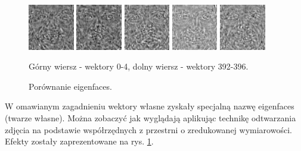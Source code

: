 \documentclass[oneside, eng]{mgr}
\begin{document}
\begin{figure}
	\begin{minipage}{2cm}
		\includegraphics[width=2cm]{392.jpg}
	\end{minipage}
	\begin{minipage}{2cm}
		\includegraphics[width=2cm]{393.jpg}
	\end{minipage}
	\begin{minipage}{2cm}
		\includegraphics[width=2cm]{394.jpg}
	\end{minipage}
	\begin{minipage}{2cm}
		\includegraphics[width=2cm]{395.jpg}
	\end{minipage}
	\begin{minipage}{2cm}
		\includegraphics[width=2cm]{396.jpg}
	\end{minipage}
	
	\caption{Porównanie eigenfaces.}
Górny wiersz - wektory 0-4, dolny wiersz - wektory 392-396.
	\label{fig:eigenfaces}
\end{figure}

W omawianym zagadnieniu wektory własne zyskały specjalną nazwę eigenfaces (twarze własne). Można zobaczyć jak wyglądają aplikując technikę odtwarzania zdjęcia na podstawie współrzędnych z przestrni o zredukowanej wymiarowości. Efekty zostały zaprezentowane na rys. \ref{fig:eigenfaces}. 
\end{document}
